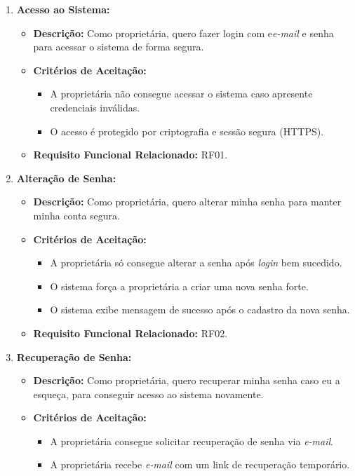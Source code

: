 \documentclass[
	12pt,				%
	openany,			%
	twoside,			%
	a4paper,			%
	english,			%
	french,				%
	spanish,			%
	brazil				%
	]{abntex2}
\begin{document}
\begin{enumerate}[label=\textbf{\arabic*.}]
	\item \textbf{Acesso ao Sistema:}
	\begin{itemize}
	 \item \textbf{Descrição:} Como proprietária, quero fazer login com e\textit{e-mail} e senha para acessar o sistema de forma segura. 
	  \item	\textbf{Critérios de Aceitação:}	
	\begin{itemize} 
		\item A proprietária não consegue acessar o sistema caso apresente credenciais inválidas.
		\item O acesso é protegido por criptografia e sessão segura (HTTPS).
	\end{itemize}
	 \item \textbf{Requisito Funcional Relacionado:} RF01.
	 	\end{itemize} 
	 	\item \textbf{Alteração de Senha:}
	 	\begin{itemize}
	 		\item \textbf{Descrição:} Como proprietária, quero alterar minha senha para manter minha conta segura.
	 		\item \textbf{Critérios de Aceitação:}
	 		\begin{itemize} 
	 			\item A proprietária só consegue alterar a senha após \textit{login} bem sucedido.
	 			\item O sistema força a proprietária a criar uma nova senha forte.
	 			\item O sistema exibe mensagem de sucesso após o cadastro da nova senha.
	 		\end{itemize}
	 		\item \textbf{Requisito Funcional Relacionado:} RF02.
	 	\end{itemize} 
	 	\item \textbf{Recuperação de Senha:}
	 	\begin{itemize}
	 		\item \textbf{Descrição:} Como proprietária, quero recuperar minha senha caso eu a esqueça, para conseguir acesso ao sistema novamente.
	 		\item \textbf{Critérios de Aceitação:}
	 		\begin{itemize} 
	 			\item A proprietária consegue solicitar recuperação de senha via \textit{e-mail}.
	 			\item A proprietária recebe \textit{e-mail} com um link de recuperação temporário.

\end{itemize}
\end{itemize}
\end{enumerate}
\end{document}
